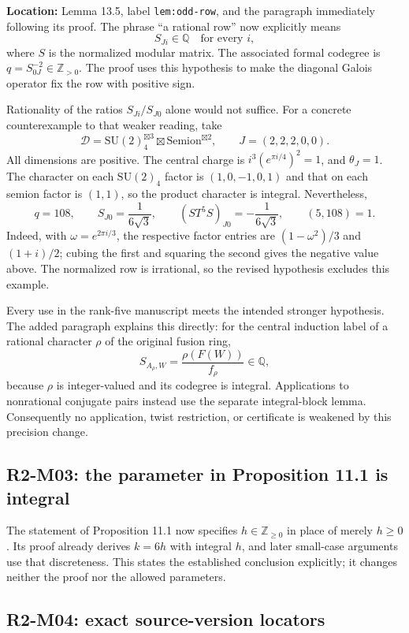 \documentclass[11pt,a4paper]{article}
\begin{document}
\textbf{Location:} Lemma 13.5, label \texttt{lem:odd-row}, and the
paragraph immediately following its proof.
The phrase ``a rational row'' now explicitly means
\[
                       S_{Ji}\in\mathbb Q\quad\text{for every }i,
\]
where $S$ is the normalized modular matrix. The associated formal
codegree is $q=S_{0J}^{-2}\in\mathbb Z_{>0}$.
The proof uses this hypothesis to make the diagonal Galois operator
fix the row with positive sign.

Rationality of the ratios $S_{Ji}/S_{J0}$ alone would not suffice.
For a concrete counterexample to that weaker reading, take
\[
 \mathcal D=\mathrm{SU}(2)_4^{\boxtimes3}
              \boxtimes\mathrm{Semion}^{\boxtimes2},
 \qquad J=(2,2,2,0,0).
\]
All dimensions are positive. The central charge is
$i^3(e^{\pi i/4})^2=1$, and $\theta_J=1$.
The character on each $\mathrm{SU}(2)_4$ factor is
$(1,0,-1,0,1)$ and that on each semion factor is $(1,1)$,
so the product character is integral. Nevertheless,
\[
 q=108,\qquad S_{J0}=\frac1{6\sqrt3},\qquad
 (ST^5S)_{J0}=-\frac1{6\sqrt3},\qquad (5,108)=1.
\]
Indeed, with $\omega=e^{2\pi i/3}$, the respective factor entries are
$(1-\omega^2)/3$ and $(1+i)/2$; cubing the first and squaring the
second gives the negative value above. The normalized row is irrational,
so the revised hypothesis excludes this example.

Every use in the rank-five manuscript meets the intended stronger
hypothesis. The added paragraph explains this directly: for the central
induction label of a rational character $\rho$ of the original fusion
ring,
\[
 S_{A_\rho,W}=\frac{\rho(F(W))}{f_\rho}\in\mathbb Q,
\]
because $\rho$ is integer-valued and its codegree is integral.
Applications to nonrational conjugate pairs instead use the separate
integral-block lemma. Consequently no application, twist restriction,
or certificate is weakened by this precision change.

\subsection{R2-M03: the parameter in Proposition 11.1 is integral}

The statement of Proposition 11.1 now specifies
$h\in\mathbb Z_{\ge0}$ in place of merely $h\ge0$.
Its proof already derives $k=6h$ with integral $h$, and later small-case
arguments use that discreteness. This states the established conclusion
explicitly; it changes neither the proof nor the allowed parameters.

\subsection{R2-M04: exact source-version locators}
\end{document}
